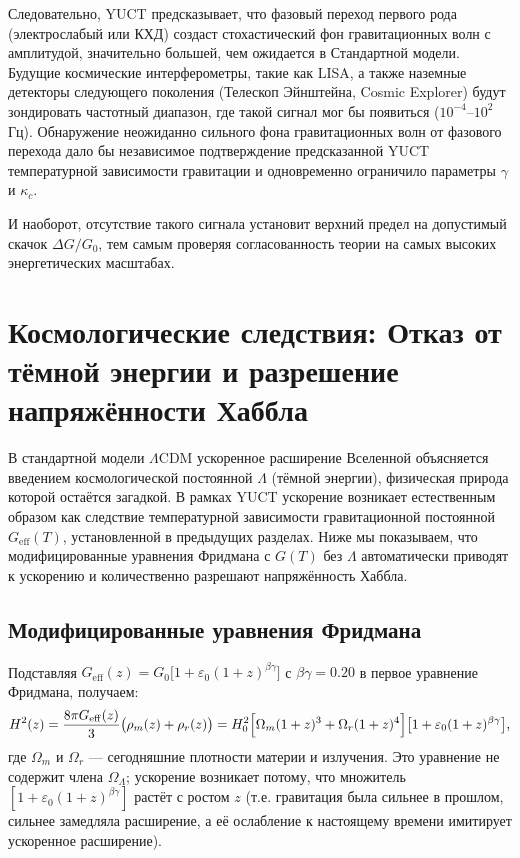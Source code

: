 \documentclass[12pt]{article}
\theoremstyle{remark}
\begin{document}
	Следовательно, YUCT предсказывает, что фазовый переход первого рода (электрослабый или КХД) создаст стохастический фон гравитационных волн с амплитудой, значительно большей, чем ожидается в Стандартной модели.
	Будущие космические интерферометры, такие как LISA, а также наземные детекторы следующего поколения (Телескоп Эйнштейна, Cosmic Explorer) будут зондировать частотный диапазон, где такой сигнал мог бы появиться ($10^{-4}$–$10^{2}$ Гц).
	Обнаружение неожиданно сильного фона гравитационных волн от фазового перехода дало бы независимое подтверждение предсказанной YUCT температурной зависимости гравитации и одновременно ограничило параметры $\gamma$ и $\kappa_c$.
	
	И наоборот, отсутствие такого сигнала установит верхний предел на допустимый скачок $\Delta G/G_0$, тем самым проверяя согласованность теории на самых высоких энергетических масштабах.
	
	\section{Космологические следствия: Отказ от тёмной энергии и разрешение напряжённости Хаббла}
	\label{sec:cosmo-consequences}
	
	В стандартной модели $\Lambda$CDM ускоренное расширение Вселенной объясняется введением космологической постоянной $\Lambda$ (тёмной энергии), физическая природа которой остаётся загадкой. В рамках YUCT ускорение возникает естественным образом как следствие температурной зависимости гравитационной постоянной $G_{\mathrm{eff}}(T)$, установленной в предыдущих разделах. Ниже мы показываем, что модифицированные уравнения Фридмана с $G(T)$ без $\Lambda$ автоматически приводят к ускорению и количественно разрешают напряжённость Хаббла.
	
	\subsection{Модифицированные уравнения Фридмана}
	
	Подставляя $G_{\mathrm{eff}}(z) = G_0\bigl[1 + \varepsilon_0 (1+z)^{\beta\gamma}\bigr]$ с $\beta\gamma = 0.20$ в первое уравнение Фридмана, получаем:
	\begin{equation}
		H^2(z) = \frac{8\pi G_{\mathrm{eff}}(z)}{3} \bigl(\rho_m(z) + \rho_r(z)\bigr) = H_0^2\Bigl[\Omega_m (1+z)^3 + \Omega_r (1+z)^4\Bigr]\bigl[1 + \varepsilon_0 (1+z)^{\beta\gamma}\bigr],
		\label{eq:friedman_yuct}
	\end{equation}
	где $\Omega_m$ и $\Omega_r$ — сегодняшние плотности материи и излучения. Это уравнение не содержит члена $\Omega_\Lambda$; ускорение возникает потому, что множитель $[1 + \varepsilon_0 (1+z)^{\beta\gamma}]$ растёт с ростом $z$ (т.е. гравитация была сильнее в прошлом, сильнее замедляла расширение, а её ослабление к настоящему времени имитирует ускоренное расширение).
	
\end{document}
